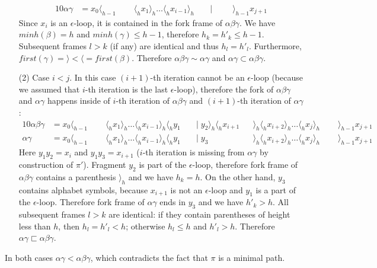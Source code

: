 \documentclass[AMA,STIX1COL]{WileyNJD-v2}
\newcommand{\Xl}{\langle}
\newcommand{\Xr}{\rangle}
\begin{document}
\begin{proofEnd}
\begin{enumerate}[itemsep=0.2em, topsep=0.5em]
\begin{alignat*}{10}
            \alpha \gamma       &= x_0 \Xl_{h-1} \;&&\; \Xl_h x_1 \Xr_h \hdots \Xl_h x_{i-1} \Xr_h \;&&\big|\;                   \;&&\; \Xr_{h-1} x_{j+1}
        \end{alignat*}
        Since $x_i$ is an $\epsilon$-loop, it is contained in the fork frame of $\alpha \beta \gamma$.
        We have $minh (\beta) = h$ and $minh (\gamma) \leq h - 1$, therefore $h_k = h'_k \leq h - 1$.
        Subsequent frames $l > k$ (if any) are identical and thus $h_l = h'_l$.
        Furthermore, $first (\gamma) = \Xr < \Xl = first (\beta)$.
        Therefore $\alpha \beta \gamma \sim \alpha \gamma$ and $\alpha \gamma \subset \alpha \beta \gamma$.

    \item[(2)]
        Case $i < j$.
        In this case $(i + 1)$-th iteration cannot be an $\epsilon$-loop
        (because we assumed that $i$-th iteration is the last $\epsilon$-loop),
        therefore the fork of $\alpha \beta \gamma$ and $\alpha \gamma$ happens
        inside of $i$-th iteration of $\alpha \beta \gamma$
        and $(i + 1)$-th iteration of $\alpha \gamma$:
        \begin{alignat*}{10}
            \alpha \beta \gamma &= x_0 \Xl_{h-1} \;&&\; \Xl_h x_1 \Xr_h \hdots \Xl_h x_{i-1} \Xr_h \Xl_h y_1 \;&&\big|\; y_2 \Xr_h \Xl_h x_{i+1} && \Xr_h \Xl_h x_{i+2} \Xr_h \hdots \Xl_h x_j \Xr_h \;&&\; \Xr_{h-1} x_{j+1} \\[-0.5em]
            \alpha \gamma       &= x_0 \Xl_{h-1} \;&&\; \Xl_h x_1 \Xr_h \hdots \Xl_h x_{i-1} \Xr_h \Xl_h y_1 \;&&\big|\; y_3                     && \Xr_h \Xl_h x_{i+2} \Xr_h \hdots \Xl_h x_j \Xr_h \;&&\; \Xr_{h-1} x_{j+1}
        \end{alignat*}
        Here $y_1 y_2 = x_i$ and $y_1 y_3 = x_{i+1}$ ($i$-th iteration is missing from $\alpha \gamma$ by construction of $\pi'$).
        Fragment $y_2$ is part of the $\epsilon$-loop,
        therefore fork frame of $\alpha \beta \gamma$ contains a parenthesis $\Xr_h$ and we have $h_k = h$.
        On the other hand, $y_3$ contains alphabet symbols,
        because $x_{i+1}$ is not an $\epsilon$-loop and $y_1$ is a part of the $\epsilon$-loop.
        Therefore fork frame of $\alpha \gamma$ ends in $y_3$ and we have $h'_k > h$.
        All subsequent frames $l > k$ are identical:
        if they contain parentheses of height less than $h$, then $h_l = h'_l < h$;
        otherwise $h_l \leq h$ and $h'_l > h$.
        Therefore $\alpha \gamma \sqsubset \alpha \beta \gamma$.
    \end{enumerate}
    In both cases $\alpha \gamma < \alpha \beta \gamma$,
    which contradicts the fact that $\pi$ is a minimal path.
\end{proofEnd}
\end{document}
